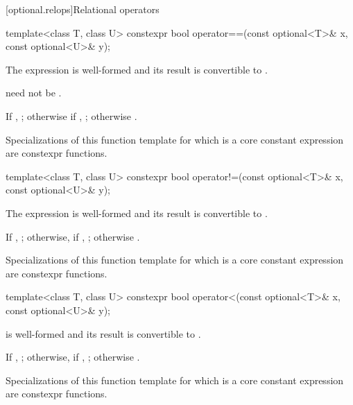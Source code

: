 [optional.relops]{Relational operators}

%
\begin{itemdecl}
template<class T, class U> constexpr bool operator==(const optional<T>& x, const optional<U>& y);
\end{itemdecl}

\begin{itemdescr}
\pnum
\constraints
The expression  is well-formed and
its result is convertible to .
\begin{note}
 need not be .
\end{note}

\pnum
\returns
If , ; otherwise if , ; otherwise .

\pnum
\remarks
Specializations of this function template
for which  is a core constant expression
are constexpr functions.
\end{itemdescr}

%
\begin{itemdecl}
template<class T, class U> constexpr bool operator!=(const optional<T>& x, const optional<U>& y);
\end{itemdecl}

\begin{itemdescr}
\pnum
\constraints
The expression  is well-formed and
its result is convertible to .

\pnum
\returns
If , ;
otherwise, if , ;
otherwise .

\pnum
\remarks
Specializations of this function template
for which  is a core constant expression
are constexpr functions.
\end{itemdescr}

%
\begin{itemdecl}
template<class T, class U> constexpr bool operator<(const optional<T>& x, const optional<U>& y);
\end{itemdecl}

\begin{itemdescr}
\pnum
\constraints
{} is well-formed
and its result is convertible to .

\pnum
\returns
If , ;
otherwise, if , ;
otherwise .

\pnum
\remarks
Specializations of this function template
for which  is a core constant expression
are constexpr functions.
\end{itemdescr}

